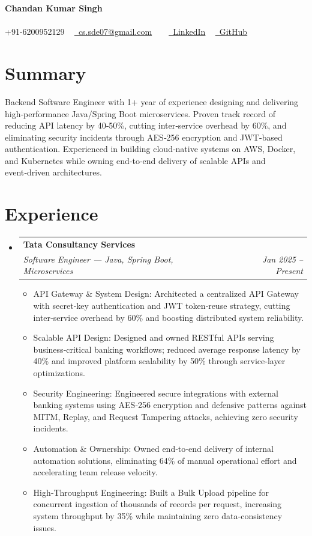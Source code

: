 \documentclass[10pt, letterpaper]{article}
\makeatletter
\newcommand{\resumeItem}[1]{
  \item\small{
    {#1 \vspace{-2pt}}
  }
}
\newcommand{\resumeSubheading}[4]{
  \vspace{-2pt}\item
    \begin{tabular*}{1.0\textwidth}[t]{l@{\extracolsep{\fill}}r}
      \textbf{#1} & \textbf{\small #2} \\
      \textit{\small#3} & \textit{\small #4} \\
    \end{tabular*}\vspace{-7pt}
}
\newcommand{\resumeSubHeadingListStart}{\begin{itemize}[leftmargin=0.0in, label={}]}
\newcommand{\resumeSubHeadingListEnd}{\end{itemize}}
\newcommand{\resumeItemListStart}{\begin{itemize}[leftmargin=0.15in]}
\newcommand{\resumeItemListEnd}{\end{itemize}\vspace{-5pt}}
\makeatother
\begin{document}
\begin{center}
    {\Huge \bfseries Chandan Kumar Singh} \\ \vspace{5pt}
    ~ \\ \vspace{5pt}
    \small \faPhone* +91-6200952129 ~ 
    \href{mailto:cs.sde07@gmail.com}{\faEnvelope~cs.sde07@gmail.com} ~ 
     ~ \href{LinkedIn}{\faLinkedin~LinkedIn}
     ~ \href{GitHub}{\faGithub~GitHub}
    
\end{center}

\section{Summary}
Backend Software Engineer with 1+ year of experience designing and delivering high‑performance Java/Spring Boot microservices. Proven track record of reducing API latency by 40‑50\%, cutting inter‑service overhead by 60\%, and eliminating security incidents through AES‑256 encryption and JWT‑based authentication. Experienced in building cloud‑native systems on AWS, Docker, and Kubernetes while owning end‑to‑end delivery of scalable APIs and event‑driven architectures.


\section{Experience}
\resumeSubHeadingListStart
  \resumeSubheading{Tata Consultancy Services}{}{Software Engineer — Java, Spring Boot, Microservices}{Jan 2025 -- Present}
    \resumeItemListStart
      \resumeItem{API Gateway \& System Design: Architected a centralized API Gateway with secret‑key authentication and JWT token‑reuse strategy, cutting inter‑service overhead by 60\% and boosting distributed system reliability.}
      \resumeItem{Scalable API Design: Designed and owned RESTful APIs serving business‑critical banking workflows; reduced average response latency by 40\% and improved platform scalability by 50\% through service‑layer optimizations.}
      \resumeItem{Security Engineering: Engineered secure integrations with external banking systems using AES‑256 encryption and defensive patterns against MITM, Replay, and Request Tampering attacks, achieving zero security incidents.}
      \resumeItem{Automation \& Ownership: Owned end‑to‑end delivery of internal automation solutions, eliminating 64\% of manual operational effort and accelerating team release velocity.}
      \resumeItem{High‑Throughput Engineering: Built a Bulk Upload pipeline for concurrent ingestion of thousands of records per request, increasing system throughput by 35\% while maintaining zero data‑consistency issues.}
    \resumeItemListEnd
\resumeSubHeadingListEnd
\end{document}
